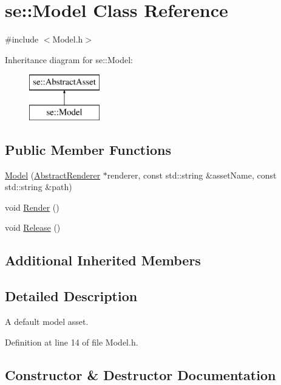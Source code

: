 \hypertarget{classse_1_1_model}{}\section{se\+:\+:Model Class Reference}
\label{classse_1_1_model}


{\ttfamily \#include $<$Model.\+h$>$}

Inheritance diagram for se\+:\+:Model\+:\begin{figure}[H]
\begin{center}
\leavevmode
\includegraphics[height=2.000000cm]{classse_1_1_model}
\end{center}
\end{figure}
\subsection*{Public Member Functions}
\begin{DoxyCompactItemize}
\item 
\mbox{\hyperlink{classse_1_1_model_ad3008603c6880370d89d1e0eee7243df}{Model}} (\mbox{\hyperlink{classse_1_1_abstract_renderer}{Abstract\+Renderer}} $\ast$renderer, const std\+::string \&asset\+Name, const std\+::string \&path)
\item 
void \mbox{\hyperlink{classse_1_1_model_a8f7aeee14ed8e5c63f8f58451d8e1d19}{Render}} ()
\item 
void \mbox{\hyperlink{classse_1_1_model_a0c1ecdbb68d2fb655e33e63ed35ddc4c}{Release}} ()
\end{DoxyCompactItemize}
\subsection*{Additional Inherited Members}


\subsection{Detailed Description}
A default model asset. 

Definition at line 14 of file Model.\+h.



\subsection{Constructor \& Destructor Documentation}
\mbox{\label{classse_1_1_model_ad3008603c6880370d89d1e0eee7243df}} 
